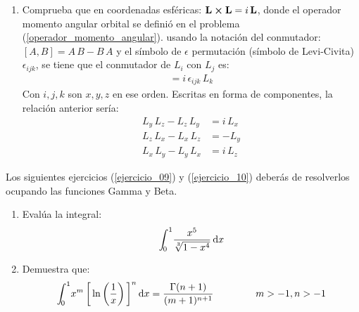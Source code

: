 \begin{enumerate}
\item Comprueba que en coordenadas esféricas: $\vb{L} \cp \vb{L} = i \, \vb{L}$, donde el operador momento angular orbital se definió en el problema (\ref{operador_momento_angular}).
usando la notación del conmutador: $[A, B] = A \, B -  B \, A$ y el símbolo de $\epsilon$ permutación (símbolo de Levi-Civita) $\epsilon_{ijk}$, se tiene que el conmutador de $L_{i}$ con $L_{j}$ es:
\begin{align*}
[L_{i}, L_{j}] = i \, \epsilon_{ijk} \, L_{k}
\end{align*}
Con $i, j, k$ son $x, y, z$ en ese orden. Escritas en forma de componentes, la relación anterior sería:
\begin{align*}
L_{y} \, L_{z} - L_{z} \, L_{y} &= i \, L_{x} \\
L_{z} \, L_{x} - L_{x} \, L_{z} &= - L_{y} \\
L_{x} \, L_{y} - L_{y} \, L_{x} &= i \, L_{z}
\end{align*}
\end{enumerate}
Los siguientes ejercicios (\ref{ejercicio_09}) y (\ref{ejercicio_10}) deberás de resolverlos ocupando las funciones Gamma y Beta.
\begin{enumerate}[resume]
\item \label{ejercicio_09} Evalúa la integral:
\begin{align*}
\scaleint{5ex}_{\bs 0}^{1} \dfrac{x^{5}}{\sqrt[3]{1 - x^{4}}} \dd{x}
\end{align*}
\item \label{ejercicio_10} Demuestra que:
\begin{align*}
\scaleint{5ex}_{\bs 0}^{1} x^{m} \, \bigg[ \ln \left( \dfrac{1}{x} \right) \bigg]^{n} \dd{x} = \dfrac{\Gamma(n + 1)}{(m + 1)^{n+1}} \hspace{1.5cm} m > -1, n > -1
\end{align*}
\end{enumerate}

